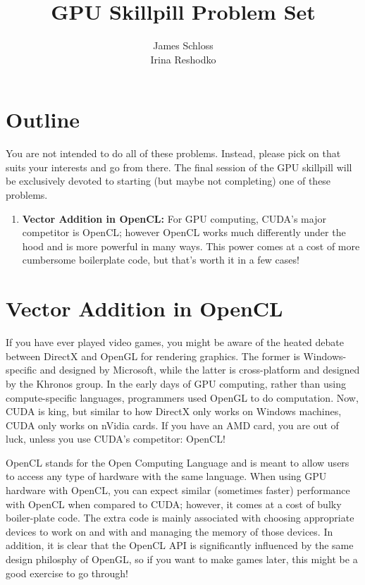 \documentclass[11pt]{article}
\title{\textbf{GPU Skillpill Problem Set}}
\author{James Schloss\\
		Irina Reshodko}
\date{}
\begin{document}
\maketitle

\section*{Outline}

You are not intended to do all of these problems. Instead, please pick on that suits your interests and go from there. The final session of the GPU skillpill will be exclusively devoted to starting (but maybe not completing) one of these problems.

\begin{enumerate}
\item \textbf{Vector Addition in OpenCL:} For GPU computing, CUDA's major competitor is OpenCL; however OpenCL works much differently under the hood and is more powerful in many ways. This power comes at a cost of more cumbersome boilerplate code, but that's worth it in a few cases!
\end{enumerate}

\newpage
\section*{Vector Addition in OpenCL}
If you have ever played video games, you might be aware of the heated debate between DirectX and OpenGL for rendering graphics. 
The former is Windows-specific and designed by Microsoft, while the latter is cross-platform and designed by the Khronos group. 
In the early days of GPU computing, rather than using compute-specific languages, programmers used OpenGL to do computation. 
Now, CUDA is king, but similar to how DirectX only works on Windows machines, CUDA only works on nVidia cards. 
If you have an AMD card, you are out of luck, unless you use CUDA's competitor: OpenCL!

OpenCL stands for the Open Computing Language and is meant to allow users to access any type of hardware with the same language. 
When using GPU hardware with OpenCL, you can expect similar (sometimes faster) performance with OpenCL when compared to CUDA; however, it comes at a cost of bulky boiler-plate code.
The extra code is mainly associated with choosing appropriate devices to work on and with and managing the memory of those devices.
In addition, it is clear that the OpenCL API is significantly influenced by the same design philosphy of OpenGL, so if you want to make games later, this might be a good exercise to go through!
\end{document}
